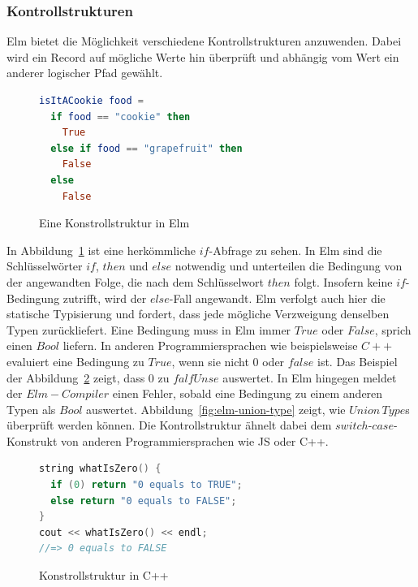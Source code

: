 \subsubsection{Kontrollstrukturen}
\label{sec:Kontrollstrukturen}
Elm bietet die Möglichkeit verschiedene Kontrollstrukturen anzuwenden. Dabei wird ein Record auf mögliche Werte hin überprüft und abhängig vom Wert ein anderer logischer Pfad gewählt.
\begin{figure}[h]
\begin{lstlisting}[language=Elm]
isItACookie food =
  if food == "cookie" then
    True
  else if food == "grapefruit" then
    False
  else
    False
\end{lstlisting}
\caption{Eine Konstrollstruktur in Elm}\label{fig:elm-conditional}
\end{figure}
In Abbildung~\ref{fig:elm-conditional} ist eine herkömmliche $if$-Abfrage zu sehen. In Elm sind die Schlüsselwörter $if$, $then$ und $else$ notwendig und unterteilen die Bedingung von der angewandten Folge, die nach dem Schlüsselwort $then$ folgt. Insofern keine $if$-Bedingung zutrifft, wird der $else$-Fall angewandt.
Elm verfolgt auch hier die statische Typisierung und fordert, dass jede mögliche Verzweigung denselben Typen zurückliefert. Eine Bedingung muss in Elm immer $True$ oder $False$, sprich einen $Bool$ liefern. In anderen Programmiersprachen wie beispielsweise $C++$ evaluiert eine Bedingung zu $True$, wenn sie nicht $0$ oder $false$ ist. Das Beispiel der Abbildung~\ref{fig:cpp-conditional} zeigt, dass $0$ zu $falfUnse$ auswertet. In Elm hingegen meldet der $Elm-Compiler$ einen Fehler, sobald eine Bedingung zu einem anderen Typen als $Bool$ auswertet.
Abbildung~\ref{fig:elm-union-type} zeigt, wie $Union\,Type$s überprüft werden können. Die Kontrollstruktur ähnelt dabei dem $switch$-$case$-Konstrukt von anderen Programmiersprachen wie \ac{JS} oder C++.
\begin{figure}[h]
\begin{lstlisting}[language=cpp]
string whatIsZero() {
  if (0) return "0 equals to TRUE";
  else return "0 equals to FALSE";
}
cout << whatIsZero() << endl;
//=> 0 equals to FALSE

\end{lstlisting}
\caption{Konstrollstruktur in C++}\label{fig:cpp-conditional}
\end{figure}

